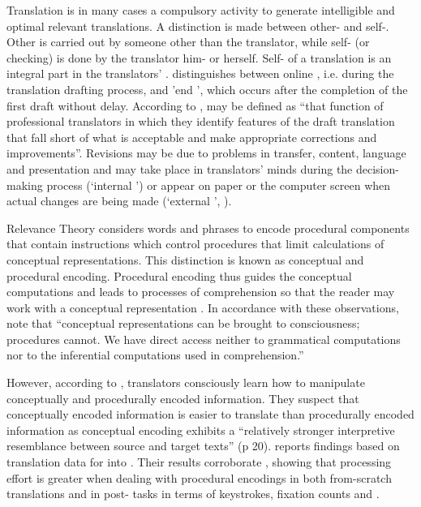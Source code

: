 \documentclass[output=paper]{LSP/langsci}
\begin{document}
Translation  is in many cases a compulsory activity to generate intelligible and optimal relevant translations. A distinction is made between other- and self-. Other  is carried out by someone other than the translator, while self- (or checking) is done by the translator him- or herself. Self- of a translation is an integral part in the translators' . \citet{Jakobsen2003} distinguishes between online , i.e.  during the translation drafting process, and 'end ', which occurs after the completion of the first draft without delay. According to \citet[109]{Mossop2007Revising},  may be defined as ``that function of professional translators in which they identify features of the draft translation that fall short of what is acceptable and make appropriate corrections and improvements''. Revisions may be due to problems in transfer, content, language and presentation \citep{Mossop2007Revising} and may take place in translators' minds during the decision-making process (`internal ') or appear on paper or the computer screen when actual changes are being made (`external ', \citealt{Kunzli2007}). 

Relevance Theory considers words and phrases to encode procedural components that contain instructions which control procedures that limit calculations of conceptual representations. This distinction is known as conceptual and procedural encoding. Procedural encoding thus guides the conceptual computations and leads to processes of comprehension so that the reader may work with a conceptual representation \citep{Blakemore2002}. In accordance with these observations, \citet[16]{Sperber1993} note that ``conceptual representations can be brought to consciousness; procedures cannot. We have direct access neither to grammatical computations nor to the inferential computations used in comprehension.'' 

However, according to \citet{Alves2003Triangulating}, translators consciously learn how to manipulate conceptually and procedurally encoded information. They suspect that conceptually encoded information is easier to translate than procedurally encoded information as conceptual encoding exhibits a ``relatively stronger interpretive resemblance between source and target texts'' (p 20). \citet{Sekino2012} reports findings based on translation data for  into . Their results corroborate \citet{Alves2003Triangulating}, showing that processing effort is greater when dealing with procedural encodings in both from-scratch translations and in post- tasks in terms of keystrokes, fixation counts and .
\end{document}
